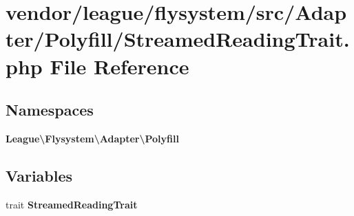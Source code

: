 \section{vendor/league/flysystem/src/\+Adapter/\+Polyfill/\+Streamed\+Reading\+Trait.php File Reference}
\label{_streamed_reading_trait_8php}
\subsection*{Namespaces}
\begin{DoxyCompactItemize}
\item 
 {\bf League\textbackslash{}\+Flysystem\textbackslash{}\+Adapter\textbackslash{}\+Polyfill}
\end{DoxyCompactItemize}
\subsection*{Variables}
\begin{DoxyCompactItemize}
\item 
trait {\bf Streamed\+Reading\+Trait}
\end{DoxyCompactItemize}
